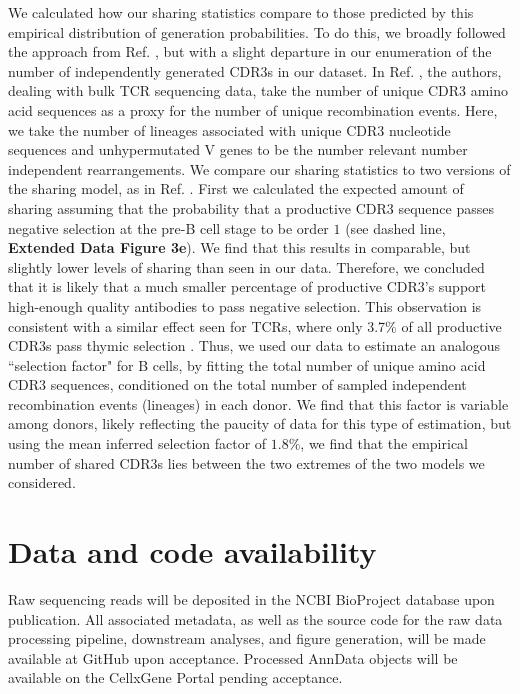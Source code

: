 We calculated how our sharing statistics compare to those predicted by this empirical distribution of generation probabilities. To do this, we broadly followed the approach from Ref. \cite{elhanati2018sharing}, but with a slight departure in our enumeration of the number of independently generated CDR3s in our dataset. In Ref. \cite{elhanati2018sharing}, the authors, dealing with bulk TCR sequencing data, take the number of unique CDR3 amino acid sequences as a proxy for the number of unique recombination events. Here, we take the number of lineages associated with unique CDR3 nucleotide sequences and unhypermutated V genes to be the number relevant number independent rearrangements. We compare our sharing statistics to two versions of the sharing model, as in Ref. \cite{elhanati2018sharing}. First we calculated the expected amount of sharing assuming that the probability that a productive CDR3 sequence passes negative selection at the pre-B cell stage to be order $1$ (see dashed line, \textbf{Extended Data Figure 3e}). We find that this results in comparable, but slightly lower levels of sharing than seen in our data. Therefore, we concluded that it is likely that a much smaller percentage of productive CDR3's support high-enough quality antibodies to pass negative selection. This observation is consistent with a similar effect seen for TCRs, where only 3.7\% of all productive CDR3s pass thymic selection \cite{elhanati2018sharing}. Thus, we used our data to estimate an analogous ``selection factor" for B cells, by fitting the total number of unique amino acid CDR3 sequences, conditioned on the total number of sampled independent recombination events (lineages) in each donor. We find that this factor is variable among donors, likely reflecting the paucity of data for this type of estimation, but using the mean inferred selection factor of $1.8\%$, we find that the empirical number of shared CDR3s lies between the two extremes of the two models we considered.

\section{Data and code availability}

Raw sequencing reads will be deposited in the NCBI BioProject database upon publication. All associated metadata, as well as the source code for the raw data processing pipeline, downstream analyses, and figure generation, will be made available at GitHub upon acceptance. Processed AnnData objects will be available on the CellxGene Portal pending acceptance. 